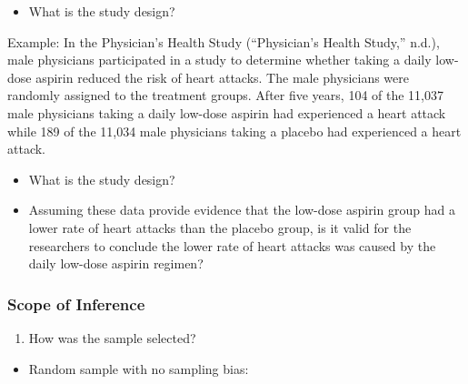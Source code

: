 \documentclass[
]{report}
\providecommand{\tightlist}{%
  \setlength{\itemsep}{0pt}\setlength{\parskip}{0pt}}
\begin{document}
\begin{itemize}
\tightlist
\item
  What is the study design?
\end{itemize}

\vspace{0.5in}

Example: In the Physician's Health Study ({``Physician's Health Study,''} n.d.), male physicians participated in a study to determine whether taking a daily low-dose aspirin reduced the risk of heart attacks. The male physicians were randomly assigned to the treatment groups. After five years, 104 of the 11,037 male physicians taking a daily low-dose aspirin had experienced a heart attack while 189 of the 11,034 male physicians taking a placebo had experienced a heart attack.

\begin{itemize}
\tightlist
\item
  What is the study design?
\end{itemize}

\vspace{0.5in}

\begin{itemize}
\tightlist
\item
  Assuming these data provide evidence that the low-dose aspirin group had a lower rate of heart attacks than the placebo group, is it valid for the researchers to conclude the lower rate of heart attacks was caused by the daily low-dose aspirin regimen?
\end{itemize}

\vspace{0.5in}

\hypertarget{scope-of-inference}{%
\subsubsection*{Scope of Inference}\label{scope-of-inference}}

\begin{enumerate}
\def\labelenumi{\arabic{enumi}.}
\tightlist
\item
  How was the sample selected?
\end{enumerate}

\begin{itemize}
\tightlist
\item
  Random sample with no sampling bias:
\end{itemize}
\end{document}
